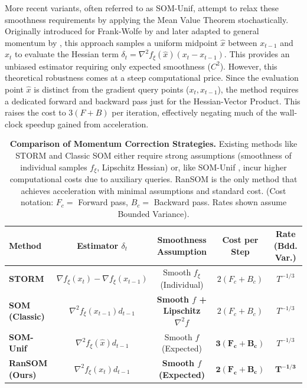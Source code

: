 \documentclass{article}
\theoremstyle{plain}
\theoremstyle{definition}
\theoremstyle{remark}
\begin{document}
More recent variants, often referred to as SOM-Unif, attempt to relax these smoothness requirements by applying the Mean Value Theorem stochastically. Originally introduced for Frank-Wolfe by \citet{zhang2020one} and later adapted to general momentum by \citet{salehkaleybar2022momentum}, this approach samples a uniform midpoint $\hat{x}$ between $x_{t-1}$ and $x_t$ to evaluate the Hessian term $\delta_t = \nabla^2 f_\xi(\hat{x})(x_t - x_{t-1})$. This provides an unbiased estimator requiring only expected smoothness ($C^2$). However, this theoretical robustness comes at a steep computational price. Since the evaluation point $\hat{x}$ is distinct from the gradient query points ($x_t, x_{t-1}$), the method requires a dedicated forward and backward pass just for the Hessian-Vector Product. This raises the cost to $3(F+B)$ per iteration, effectively negating much of the wall-clock speedup gained from acceleration.

\begin{table}[t]
\centering
\caption{\textbf{Comparison of Momentum Correction Strategies.} Existing methods like STORM \cite{cutkosky2019storm} and Classic SOM \cite{tran2022better} either require strong assumptions (smoothness of individual samples $f_\xi$, Lipschitz Hessian) or, like SOM-Unif \cite{zhang2020one, salehkaleybar2022momentum}, incur higher computational costs due to auxiliary queries. RanSOM is the only method that achieves acceleration with minimal assumptions and standard cost. (Cost notation: $F_c=$ Forward pass, $B_c=$ Backward pass. Rates shown assume Bounded Variance).}
\label{tab:comparison}
\begin{tabular}{lcccc}
\toprule
\textbf{Method} & \textbf{Estimator $\delta_t$} & \textbf{Smoothness Assumption} & \textbf{Cost per Step} & \textbf{Rate (Bdd. Var.)} \\
\midrule
\textbf{STORM} & $\nabla f_\xi(x_t) - \nabla f_\xi(x_{t-1})$ & Smooth $f_\xi$ (Individual) & $2(F_c+B_c)$ & $T^{-1/3}$ \\
\textbf{SOM (Classic)} & $\nabla^2 f_\xi(x_{t-1}) d_{t-1}$ & \textbf{Smooth $f$ + Lipschitz $\nabla^2 f$} & $2(F_c+B_c)$ & $T^{-1/3}$ \\
\textbf{SOM-Unif} & $\nabla^2 f_\xi(\hat{x}) d_{t-1}$ & Smooth $f$ (Expected) & $\mathbf{3(F_c+B_c)}$ & $T^{-1/3}$ \\
\midrule
\textbf{RanSOM (Ours)} & $\nabla^2 f_\xi(x_t) d_{t-1}$ & \textbf{Smooth $f$ (Expected)} & $\mathbf{2(F_c+B_c)}$ & $\mathbf{T^{-1/3}}$ \\
\bottomrule
\end{tabular}
\end{table}
\end{document}
